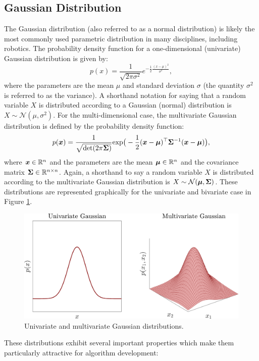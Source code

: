 \subsection{Gaussian Distribution}
The Gaussian distribution (also referred to as a normal distribution) is likely the most commonly used parametric distribution in many disciplines, including robotics. The probability density function for a one-dimensional (univariate) Gaussian distribution is given by:
\begin{equation}
p(x) = \frac{1}{\sqrt{2\pi \sigma^2}} e^{-\frac{1}{2}\frac{(x-\mu)^2}{\sigma^2}},
\end{equation}
where the parameters are the mean $\mu$ and standard deviation $\sigma$ (the quantity $\sigma^2$ is referred to as the variance). A shorthand notation for saying that a random variable $X$ is distributed according to a Gaussian (normal) distribution is $X \sim \mathcal{N}(\mu,\sigma^2)$.
For the multi-dimensional case, the multivariate Gaussian distribution is defined by the probability density function:
\begin{equation}
p(\bm{x}) = \frac{1}{\sqrt{\text{det}(2\pi \bm{\Sigma})}} \text{exp}\big( -\frac{1}{2}(\bm{x}-\bm{\mu})^\top  \bm{\Sigma}^{-1} (\bm{x}-\bm{\mu}) \big),
\end{equation}
where $\bm{x}\in \mathbb{R}^n$ and the parameters are the mean $\bm{\mu} \in \mathbb{R}^n$ and the covariance matrix $\bm{\Sigma} \in \mathbb{R}^{n \times n}$. Again, a shorthand to say a random variable $X$ is distributed according to the multivariate Gaussian distribution is $X \sim \mathcal{N}(\bm{\mu},\bm{\Sigma})$. These distributions are represented graphically for the univariate and bivariate case in Figure \ref{fig:Gaussians}.
\begin{figure}[ht]
\centering
\includegraphics[width=.85\textwidth]{tex/figs/ch14_figs/gaussians.png}
\caption{Univariate and multivariate Gaussian distributions.}
\label{fig:Gaussians}
\end{figure}
These distributions exhibit several important properties which make them particularly attractive for algorithm development:
